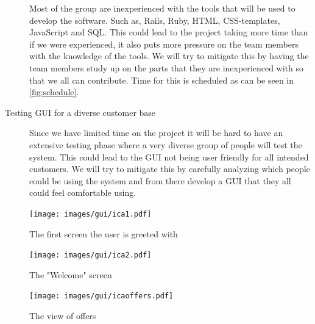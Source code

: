 \documentclass[a4paper,twoside,titlepage]{article}
\begin{document}
\begin{description}
			Most of the group are inexperienced with the tools that will be used to develop the software. Such as, Rails, Ruby, HTML, CSS-templates, JavaScript and SQL. This could lead to the project taking more time than if we were experienced, it also puts more pressure on the team members with the knowledge of the tools.
			We will try to mitigate this by having the team members study up on the parts that they are inexperienced with so that we all can contribute. Time for this is scheduled as can be seen in \autoref{fig:schedule}.
		\item[Testing GUI for a diverse customer base]
			Since we have limited time on the project it will be hard to have an extensive testing phase where a very diverse group of people will test the system. This could lead to the GUI not being user friendly for all intended customers. We will try to mitigate this by carefully analyzing which people could be using the system and from there develop a GUI that they all could feel comfortable using.
		\end{description}





 
 

    \clearpage
    \appendix

            \begin{figure}[ht]
               \centering
                  \texttt{[image: images/gui/ica1.pdf]}
               \caption{The first screen the user is greeted with}
               \label{fig:gui_login}
            \end{figure}

            \begin{figure}[ht]
               \centering
                  \texttt{[image: images/gui/ica2.pdf]}
               \caption{The "Welcome" screen}
               \label{fig:gui_welcome}
            \end{figure}

            \begin{figure}[ht]
               \centering
                  \texttt{[image: images/gui/icaoffers.pdf]}
               \caption{The view of offers}
               \label{fig:gui_offers}
            \end{figure}
\end{document}
